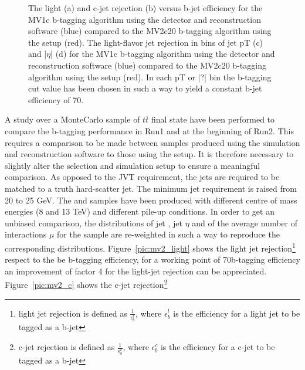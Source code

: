 \begin{figure}
\hfill
{}
\hfill \null
\caption{The light (a) and c-jet rejection (b) versus b-jet efficiency for the MV1c b-tagging algorithm using the \runone detector and reconstruction software (blue) compared to the MV2c20 b-tagging algorithm using the \runtwo setup (red). The light-flavor jet rejection in bins of jet pT (c) and |$\eta$| (d) for the MV1c b-tagging algorithm using the \runone detector and reconstruction software (blue) compared to the MV2c20 b-tagging algorithm using the \runtwo setup (red). In each pT or |?| bin the b-tagging cut value has been chosen in such a way to yield a constant b-jet efficiency of 70\percent.}
\end{figure}
A study over a MonteCarlo sample of $t\overline{t}$ final state have been performed to compare the b-tagging performance in Run1 and at the beginning of Run2.
This requires a comparison to be made between samples produced using the \runone simulation and reconstruction software to those using the \runtwo setup. It is therefore necessary to slightly alter the selection and simulation setup to ensure a meaningful comparison. As opposed to the JVT requirement, the jets are required to be matched to a truth hard-scatter jet. The minimum jet \pt requirement is raised from 20 to 25 GeV. %
The \runone and \runtwo samples have been produced with different centre of mass energies (8 and 13 TeV) and different pile-up conditions. In order to get an unbiased comparison, the distributions of jet \pt , jet $\eta$ and of the average number of interactions $\mu$ for the \runtwo sample are re-weighted in such a way to reproduce the corresponding \runone distributions.
Figure~\ref{pic:mv2_light} shows the light jet rejection\footnote{light jet rejection is defined as $\frac{1}{\epsilon^l_b}$, where $\epsilon^l_b$ is the efficiency for a light jet to be tagged as a b-jet} respect to the be b-tagging efficiency, for a working point of 70\percent b-tagging efficiency an improvement of factor 4 for the light-jet rejection can be appreciated. Figure~\ref{pic:mv2_c} shows the c-jet rejection\footnote{c-jet rejection is defined as $\frac{1}{\epsilon^c_b}$, where $\epsilon^c_b$ is the efficiency for a c-jet to be tagged as a b-jet} 

